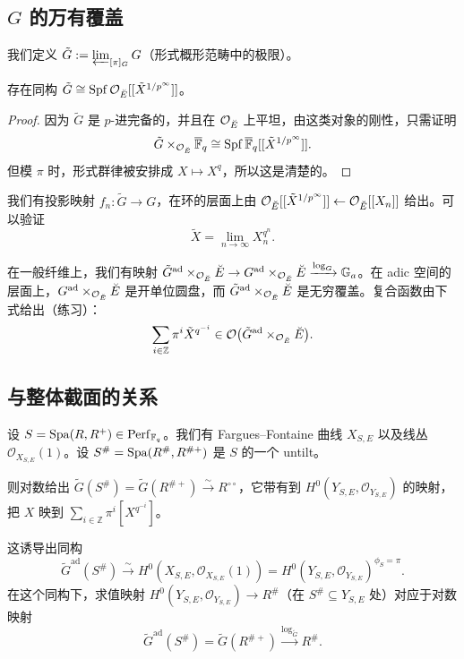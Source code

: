 \subsection{$G$ 的万有覆盖}

\begin{definition}
我们定义 $\tilde G := \varprojlim_{[\pi]_G} G$（形式概形范畴中的极限）。
\end{definition}

\begin{proposition}
存在同构 $\tilde G \cong \operatorname{Spf} \mathcal O_{\breve{E}}[[\tilde X^{1/p^\infty}]]$。
\end{proposition}

\begin{proof}
因为 $\tilde G$ 是 $p$-进完备的，并且在 $\mathcal O_{\breve{E}}$ 上平坦，由这类对象的刚性，只需证明
\[
  \tilde G \times_{\mathcal O_{\breve{E}}} \overline{\mathbb{F}}_q \cong \operatorname{Spf} \overline{\mathbb{F}}_q[[\tilde X^{1/p^\infty}]].
\]
但模 $\pi$ 时，形式群律被安排成 $X \mapsto X^q$，所以这是清楚的。
\end{proof}

我们有投影映射 $f_n: \tilde G \to G$，在环的层面上由 $\mathcal O_{\breve{E}}[[\tilde X^{1/p^\infty}]] \leftarrow \mathcal O_{\breve{E}}[[X_n]]$ 给出。可以验证
\[
  \tilde X = \lim_{n\to\infty} X_n^{q^n}.
\]

在一般纤维上，我们有映射 $\tilde G^{\mathrm{ad}} \times_{\mathcal O_{\breve{E}}} \breve{E} \to G^{\mathrm{ad}} \times_{\mathcal O_{\breve{E}}} \breve{E} \xrightarrow{\log_G} \mathbb G_a$。在 adic 空间的层面上，$G^{\mathrm{ad}} \times_{\mathcal O_{\breve{E}}} \breve{E}$ 是开单位圆盘，而 $\tilde G^{\mathrm{ad}} \times_{\mathcal O_{\breve{E}}} \breve{E}$ 是无穷覆盖。复合函数由下式给出（练习）：
\[
  \sum_{i \in \mathbb Z} \pi^i \tilde X^{q^{-i}} \in \mathcal O\bigl(\tilde G^{\mathrm{ad}} \times_{\mathcal O_{\breve{E}}} \breve{E}\bigr).
\]

\subsection{与整体截面的关系}

设 $S = \operatorname{Spa}(R,R^+) \in \mathrm{Perf}_{\mathbb{F}_q}$。我们有 Fargues–Fontaine 曲线 $X_{S,E}$ 以及线丛 $\mathcal O_{X_{S,E}}(1)$。设 $S^{\#} = \operatorname{Spa}(R^{\#},R^{\#+})$ 是 $S$ 的一个 untilt。

则对数给出 $\tilde G(S^{\#}) = \tilde G(R^{\#+}) \xrightarrow{\sim} R^{\circ\circ}$，它带有到 $H^0(Y_{S,E},\mathcal O_{Y_{S,E}})$ 的映射，把 $X$ 映到 $\sum_{i\in\mathbb Z} \pi^i[X^{q^{-i}}]$。

\begin{proposition}
这诱导出同构
\[
  \tilde G^{\mathrm{ad}}(S^{\#}) \xrightarrow{\sim} H^0(X_{S,E},\mathcal O_{X_{S,E}}(1)) = H^0(Y_{S,E},\mathcal O_{Y_{S,E}})^{\phi_S=\pi}.
\]
在这个同构下，求值映射 $H^0(Y_{S,E},\mathcal O_{Y_{S,E}}) \to R^{\#}$（在 $S^{\#} \subseteq Y_{S,E}$ 处）对应于对数映射
\[
  \tilde G^{\mathrm{ad}}(S^{\#}) = \tilde G(R^{\#+}) \xrightarrow{\log_{\tilde G}} R^{\#}.
\]
\end{proposition}

